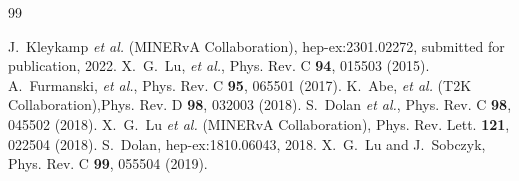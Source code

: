 \begin{thebibliography}{99}

%
%
%
 J.~Kleykamp {\it et al.} (MINERvA Collaboration), hep-ex:2301.02272, submitted for publication, 2022.
%
X.~G.~Lu, {\it et al.}, Phys. Rev. C \textbf{94}, 015503 (2015).
%
A.~Furmanski, {\it et al.}, Phys. Rev. C \textbf{95}, 065501 (2017).
%
K.~Abe, {\it et al.} (T2K Collaboration),Phys. Rev. D \textbf{98}, 032003 (2018).
%
S.~Dolan {\it et al.}, Phys. Rev. C \textbf{98}, 045502 (2018).
%
X.~G.~Lu {\it et al.} (MINERvA Collaboration), Phys. Rev. Lett. \textbf{121}, 022504 (2018).
%
S.~Dolan, hep-ex:1810.06043, 2018.
%
X.~G.~Lu and J.~Sobczyk, Phys. Rev. C \textbf{99}, 055504 (2019).


\end{thebibliography}

